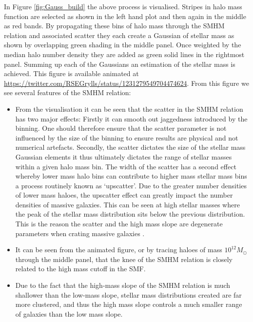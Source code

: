 In Figure \ref{fig:Gauss_build} the above process is visualised. Stripes in halo mass function are selected as shown in the left hand plot and then again in the middle as red bands. By propagating these bins of halo mass through the SMHM relation and associated scatter they each create a Gaussian of stellar mass as shown by overlapping green shading in the middle panel. Once weighted by the median halo number density they are added as green solid lines in the rightmost panel. Summing up each of the Gaussians an estimation of the stellar mass is achieved. This figure is available animated at \url{https://twitter.com/RSEGrylls/status/1231279549704474624}. From this figure we see several features of the SMHM relation:
\begin{itemize}
    \item From the visualisation it can be seen that the scatter in the SMHM relation has two major effects: Firstly it can smooth out jaggedness introduced by the binning. One should therefore ensure that the scatter parameter is not influenced by the size of the binning to ensure results are physical and not numerical artefacts. Secondly, the scatter dictates the size of the stellar mass Gaussian elements it thus ultimately dictates the range of stellar masses within a given halo mass bin. The width of the scatter has a second effect whereby lower mass halo bins can contribute to higher mass stellar mass bins a process routinely known as `upscatter'. Due to the greater number densities of lower mass haloes, the upscatter effect can greatly impact the number densities of massive galaxies. This can be seen at high stellar masses where the peak of the stellar mass distribution sits below the previous distribution. This is the reason the scatter and the high mass slope are degenerate parameters when crating massive galaxies \cite{Shankar2014ON1}.
    \item It can be seen from the animated figure, or by tracing haloes of mass $10^{12} M_{\odot}$ through the middle panel, that the knee of the SMHM relation is closely related to the high mass cutoff in the SMF.
    \item Due to the fact that the high-mass slope of the SMHM relation is much shallower than the low-mass slope, stellar mass distributions created are far more clustered, and thus the high mass slope controls a much smaller range of galaxies than the low mass slope.
\end{itemize}

